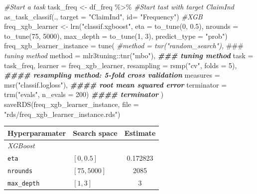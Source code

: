 \documentclass[
]{article}
\newenvironment{Shaded}{\begin{snugshade}}{\end{snugshade}}
\newcommand{\AlertTok}[1]{\textcolor[rgb]{0.94,0.16,0.16}{#1}}
\newcommand{\AttributeTok}[1]{\textcolor[rgb]{0.77,0.63,0.00}{#1}}
\newcommand{\CommentTok}[1]{\textcolor[rgb]{0.56,0.35,0.01}{\textit{#1}}}
\newcommand{\DecValTok}[1]{\textcolor[rgb]{0.00,0.00,0.81}{#1}}
\newcommand{\DocumentationTok}[1]{\textcolor[rgb]{0.56,0.35,0.01}{\textbf{\textit{#1}}}}
\newcommand{\FloatTok}[1]{\textcolor[rgb]{0.00,0.00,0.81}{#1}}
\newcommand{\FunctionTok}[1]{\textcolor[rgb]{0.00,0.00,0.00}{#1}}
\newcommand{\NormalTok}[1]{#1}
\newcommand{\OtherTok}[1]{\textcolor[rgb]{0.56,0.35,0.01}{#1}}
\newcommand{\SpecialCharTok}[1]{\textcolor[rgb]{0.00,0.00,0.00}{#1}}
\newcommand{\StringTok}[1]{\textcolor[rgb]{0.31,0.60,0.02}{#1}}
\begin{document}
\begin{Shaded}
\begin{Highlighting}[]
\CommentTok{\#Start a task}
\NormalTok{task\_freq }\OtherTok{\textless{}{-}}\NormalTok{ df\_freq }\SpecialCharTok{\%\textgreater{}\%}
  \CommentTok{\#Start tast with target ClaimInd}
  \FunctionTok{as\_task\_classif}\NormalTok{(.,}
               \AttributeTok{target =} \StringTok{"ClaimInd"}\NormalTok{,}
               \AttributeTok{id=} \StringTok{"Frequency"}\NormalTok{)}
\CommentTok{\#XGB}
\NormalTok{freq\_xgb\_learner }\OtherTok{\textless{}{-}} \FunctionTok{lrn}\NormalTok{(}\StringTok{"classif.xgboost"}\NormalTok{, }
                        \AttributeTok{eta =} \FunctionTok{to\_tune}\NormalTok{(}\DecValTok{0}\NormalTok{, }\FloatTok{0.5}\NormalTok{),}
                        \AttributeTok{nrounds =} \FunctionTok{to\_tune}\NormalTok{(}\DecValTok{75}\NormalTok{, }\DecValTok{5000}\NormalTok{),}
                        \AttributeTok{max\_depth =} \FunctionTok{to\_tune}\NormalTok{(}\DecValTok{1}\NormalTok{, }\DecValTok{3}\NormalTok{),}
                        \AttributeTok{predict\_type =} \StringTok{"prob"}\NormalTok{)}
\NormalTok{freq\_xgb\_learner\_instance }\OtherTok{=} \FunctionTok{tune}\NormalTok{(}
    \CommentTok{\#method = tnr("random\_search"), }\AlertTok{\#\#\#}\CommentTok{ tuning method}
    \AttributeTok{method =}\NormalTok{ mlr3tuning}\SpecialCharTok{::}\FunctionTok{tnr}\NormalTok{(}\StringTok{"mbo"}\NormalTok{), }\DocumentationTok{\#\#\# tuning method}
    \AttributeTok{task =}\NormalTok{ task\_freq,}
    \AttributeTok{learner =}\NormalTok{ freq\_xgb\_learner,}
    \AttributeTok{resampling =} \FunctionTok{rsmp}\NormalTok{(}\StringTok{"cv"}\NormalTok{, }\AttributeTok{folds =} \DecValTok{5}\NormalTok{), }\DocumentationTok{\#\#\#\# resampling method: 5{-}fold cross validation}
    \AttributeTok{measures =} \FunctionTok{msr}\NormalTok{(}\StringTok{"classif.logloss"}\NormalTok{), }\DocumentationTok{\#\#\#\# root mean squared error}
    \AttributeTok{terminator =} \FunctionTok{trm}\NormalTok{(}\StringTok{"evals"}\NormalTok{, }\AttributeTok{n\_evals =} \DecValTok{200}\NormalTok{) }\DocumentationTok{\#\#\#\# terminator}
\NormalTok{  )}
\FunctionTok{saveRDS}\NormalTok{(freq\_xgb\_learner\_instance, }\AttributeTok{file =} \StringTok{"rds/freq\_xgb\_learner\_instance.rds"}\NormalTok{)}
\end{Highlighting}
\end{Shaded}

\begin{longtable}[]{@{}llc@{}}
\toprule()
\textbf{Hyperparamater} & \textbf{Search space} & \textbf{Estimate} \\
\midrule()
\endhead
\emph{XGBoost} & & \\
\texttt{eta} & \([0,0.5]\) & 0.172823 \\
\texttt{nrounds} & \([75,5000]\) & 2085 \\
\texttt{max\_depth} & \([1,3]\) & 3 \\
\bottomrule()
\end{longtable}
\end{document}
